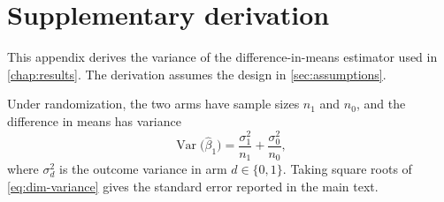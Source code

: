 \chapter{Supplementary derivation}\label{app:derivation}

This appendix derives the variance of the difference-in-means estimator used in \cref{chap:results}. The derivation assumes the design in \cref{sec:assumptions}.

Under randomization, the two arms have sample sizes $n_1$ and $n_0$, and the difference in means has variance
\begin{equation}\label{eq:dim-variance}
  \operatorname{Var}\bigl(\hat\beta_1\bigr) = \frac{\sigma_1^2}{n_1} + \frac{\sigma_0^2}{n_0},
\end{equation}
where $\sigma_d^2$ is the outcome variance in arm $d \in \{0,1\}$. Taking square roots of \cref{eq:dim-variance} gives the standard error reported in the main text.
